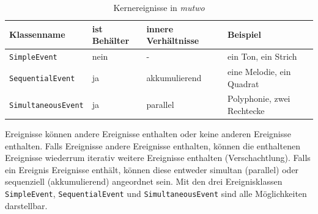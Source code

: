 \documentclass[12pt,a4paper,ngerman]{article}
\begin{document}
\bigskip


% 

\begin{table}[h!]
    \begin{center}
        \begin{tabular}{l l l l} 
            \hline
            Klassenname & ist Behälter & innere Verhältnisse & Beispiel \\ [0.5ex] 
            \hline\hline
            \texttt{SimpleEvent} & nein & - & ein Ton, ein Strich \\ 
            \texttt{SequentialEvent} & ja & akkumulierend & eine Melodie, ein Quadrat \\ 
            \texttt{SimultaneousEvent} & ja & parallel & Polyphonie, zwei Rechtecke \\ [1ex] 
            \hline
        \end{tabular}
    \end{center}

    \caption{Kernereignisse in \emph{mutwo}}
\end{table}

Ereignisse können andere Ereignisse enthalten oder keine anderen Ereignisse enthalten.
Falls Ereignisse andere Ereignisse enthalten, können die enthaltenen Ereignisse wiederrum iterativ weitere Ereignisse enthalten (Verschachtlung).
Falls ein Ereignis Ereignisse enthält, können diese entweder simultan (parallel) oder sequenziell (akkumulierend) angeordnet sein.
Mit den drei Ereignisklassen \texttt{SimpleEvent}, \texttt{SequentialEvent} und \texttt{SimultaneousEvent} sind alle Möglichkeiten darstellbar.
\end{document}
